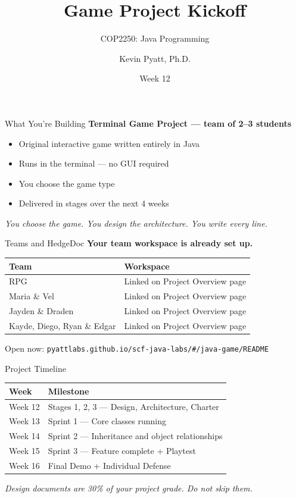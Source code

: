 \documentclass{beamer}
\title[Game Project Kickoff]{Game Project Kickoff}
\subtitle{COP2250: Java Programming}
\author{Kevin Pyatt, Ph.D.}
\institute{State College of Florida \\ Pyatt Labs}
\date{Week 12}
\begin{document}
\begin{frame}
  \titlepage
\end{frame}
\begin{frame}{What You're Building}
\textbf{Terminal Game Project --- team of 2--3 students}
\vspace{0.3cm}
\begin{itemize}
  \item Original interactive game written entirely in Java
  \item Runs in the terminal --- no GUI required
  \item You choose the game type
  \item Delivered in stages over the next 4 weeks
\end{itemize}
\vspace{0.3cm}
\textit{You choose the game. You design the architecture. You write every line.}
\end{frame}
\begin{frame}{Teams and HedgeDoc}
\textbf{Your team workspace is already set up.}
\vspace{0.3cm}
\begin{tabular}{ll}
\toprule
\textbf{Team} & \textbf{Workspace} \\
\midrule
RPG & Linked on Project Overview page \\
Maria \& Vel & Linked on Project Overview page \\
Jayden \& Draden & Linked on Project Overview page \\
Kayde, Diego, Ryan \& Edgar & Linked on Project Overview page \\
\bottomrule
\end{tabular}
\vspace{0.3cm}
Open now: \texttt{pyattlabs.github.io/scf-java-labs/\#/java-game/README}
\end{frame}
\begin{frame}{Project Timeline}
\begin{tabular}{ll}
\toprule
\textbf{Week} & \textbf{Milestone} \\
\midrule
Week 12 & Stages 1, 2, 3 --- Design, Architecture, Charter \\
Week 13 & Sprint 1 --- Core classes running \\
Week 14 & Sprint 2 --- Inheritance and object relationships \\
Week 15 & Sprint 3 --- Feature complete + Playtest \\
Week 16 & Final Demo + Individual Defense \\
\bottomrule
\end{tabular}
\vspace{0.3cm}
\textit{Design documents are 30\% of your project grade. Do not skip them.}
\end{frame}
\end{document}

